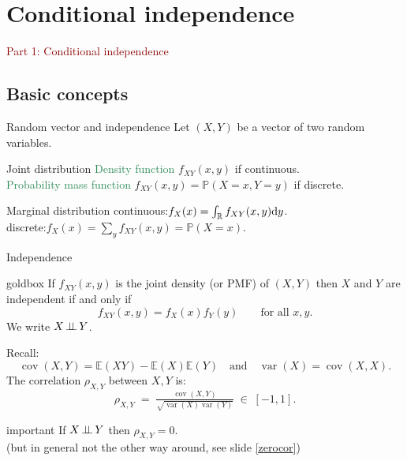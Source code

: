 \documentclass[dvipsnames,aspectratio=169]{beamer} %
\DeclareMathOperator{\cov}{cov}
\DeclareMathOperator{\var}{var}
\newcommand{\E}{\mathbb{E}}
\renewcommand{\P}{\mathbb{P}}
\newcommand{\R}{\mathbb{R}}
\newcommand{\indep}{\mbox{\,$\perp\!\!\!\perp$\,}}
\begin{document}
\section{Conditional independence}
\begin{frame}{}
\begin{center}
	{\Huge \textcolor{DarkRed}{Part 1: Conditional independence}}
\end{center}
\end{frame}
\subsection{Basic concepts}
\begin{frame}{Random vector and independence}
	Let $(X,Y)$ be a vector of two random variables.
	\begin{alertblock}{Joint distribution}
		\textcolor{SeaGreen}{Density function} $f_{XY}(x,y)$ if continuous.\\[.1cm]
		\textcolor{SeaGreen}{Probability mass function} $f_{XY}(x,y)=\P(X=x,Y=y)$ if discrete.
	\end{alertblock}
		\begin{alertblock}{Marginal distribution}
continuous:\;\;\;$f_X(x)=\int_\R f_{XY}(x,y){\rm d}y$.\\[.1cm]
discrete:\;\;\;$f_X(x)=\sum_y f_{XY}(x,y)=\P(X=x)$.
	\end{alertblock}
\end{frame}

\begin{frame}{Independence}
\begin{beamercolorbox}[wd=\paperwidth,sep=2pt]{goldbox}
	If $f_{XY}(x,y)$ is the joint density (or PMF) of $(X,Y)$ then $X$ and $Y$ are independent if and only if \\[-.5cm] $$ f_{XY}(x,y)=f_X(x)f_Y(y)\qquad\mbox{for all }x,y.$$
		We write \alert{$X\indep Y$}.	
\end{beamercolorbox}
		Recall:
		$$
		\cov(X,Y)=\E(XY)-\E(X)\E(Y)\quad\mbox{and}\quad \var(X)=\cov(X,X).
		$$
		The correlation $\rho_{X,Y}$ between $X,Y$ is:
		$$
		\rho_{X,Y}\;=\;\tfrac{\cov(X,Y)}{\sqrt{\var(X)\var(Y)}}\;\in\;[-1,1].
		$$
		\begin{beamercolorbox}[wd=\paperwidth,sep=2pt]{important}
			If $X\indep Y$ then $\rho_{X,Y}=0$.\\ {\footnotesize(but in general not the other way around, see slide \ref{zerocor})}
		\end{beamercolorbox}
\end{frame}
\end{document}
